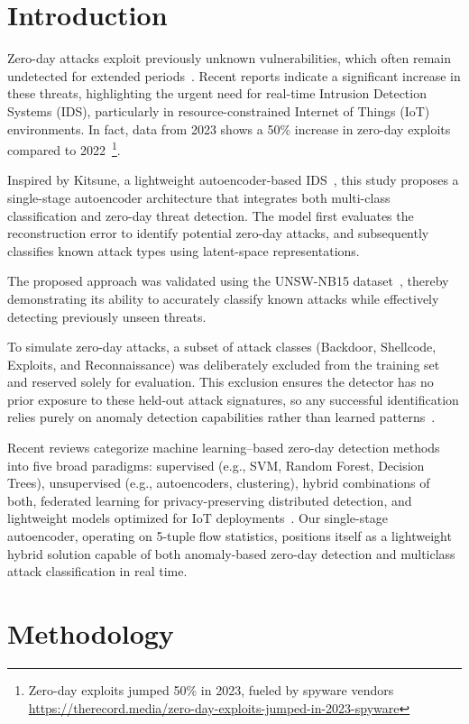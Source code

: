 \documentclass[runningheads]{llncs}
\begin{document}
\section{Introduction}
Zero-day attacks exploit previously unknown vulnerabilities, which often remain undetected for extended periods~\cite{bilge_2012}. Recent reports indicate a significant increase in these threats, highlighting the urgent need for real-time Intrusion Detection Systems (IDS), particularly in resource-constrained Internet of Things (IoT) environments. In fact, data from 2023 shows a 50\% increase in zero-day exploits compared to 2022~\footnote{Zero-day exploits jumped 50\% in 2023, fueled by spyware vendors \url{https://therecord.media/zero-day-exploits-jumped-in-2023-spyware}}.

Inspired by Kitsune, a lightweight autoencoder-based IDS~\cite{mirsky_2018}, this study proposes a single-stage autoencoder architecture that integrates both multi-class classification and zero-day threat detection. The model first evaluates the reconstruction error to identify potential zero-day attacks, and subsequently classifies known attack types using latent-space representations.

The proposed approach was validated using the UNSW-NB15 dataset~\cite{moustafa_2015}, thereby demonstrating its ability to accurately classify known attacks while effectively detecting previously unseen threats.

To simulate zero-day attacks, a subset of attack classes (Backdoor, Shellcode, Exploits, and Reconnaissance) was deliberately excluded from the training set and reserved solely for evaluation. This exclusion ensures the detector has no prior exposure to these held-out attack signatures, so any successful identification relies purely on anomaly detection capabilities rather than learned patterns~\cite{10577735}.

Recent reviews categorize machine learning–based zero-day detection methods into five broad paradigms: supervised (e.g., SVM, Random Forest, Decision Trees), unsupervised (e.g., autoencoders, clustering), hybrid combinations of both, federated learning for privacy-preserving distributed detection, and lightweight models optimized for IoT deployments~\cite{10851751}. Our single-stage autoencoder, operating on 5-tuple flow statistics, positions itself as a lightweight hybrid solution capable of both anomaly-based zero-day detection and multiclass attack classification in real time.

\section{Methodology}\label{sec:Methodology}
\end{document}
